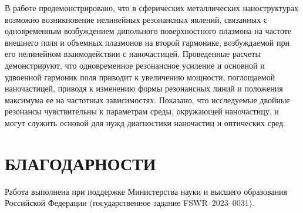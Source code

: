 \documentclass[12pt, a4paper]{article}
\begin{document}
В работе продемонстрировано, что в сферических металлических наноструктурах возможно возникновение нелинейных резонансных явлений, связанных с одновременным возбуждением дипольного поверхностного плазмона на частоте внешнего поля и объемных плазмонов на второй гармонике, возбуждаемой при его нелинейном взаимодействии с наночастицей. Проведенные расчеты демонстрируют, что одновременное резонансное усиление и основной и удвоенной гармоник поля приводит к увеличению мощности, поглощаемой наночастицей, приводя к изменению  формы резонансных линий и положения максимума ее на частотных зависимостях. Показано, что исследуемые двойные резонансы чувствительны к параметрам среды, окружающей наночастицу, и могут служить основой для нужд диагностики наночастиц и оптических сред.

\section{БЛАГОДАРНОСТИ}
Работа выполнена при поддержке Министерства науки и высшего образования Российской Федерации (государственное задание FSWR–2023–0031).
\newpage
\end{document}
